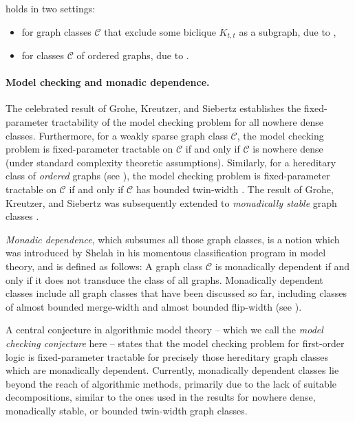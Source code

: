 \documentclass[11pt]{article}
\newcommand{\sz}[1]{\todo[color=pink!40]{sz: #1}}
\theoremstyle{remark}
\def\cal{\mathcal}
\newcommand{\CC}{\cal C}
\begin{document}
  holds in two settings:
 \begin{itemize}
  \item for graph classes $\CC$ that exclude some biclique $K_{t,t}$ as a subgraph, due to ,
  \item for classes $\CC$ of ordered graphs, due to .
 \end{itemize}


\paragraph{Model checking and monadic dependence.}
The celebrated result of Grohe, Kreutzer, and Siebertz \cite{gks} establishes the fixed-parameter tractability
of the model checking problem
for all nowhere dense classes.
Furthermore, for a weakly sparse graph class $\CC$,
the model checking problem is fixed-parameter tractable on $\CC$ if and only if $\CC$
is nowhere dense (under standard complexity theoretic assumptions).
Similarly, for a hereditary class of \emph{ordered} graphs (see ),
the model  checking problem is fixed-parameter tractable on $\CC$ if and only if $\CC$ has bounded twin-width \cite{tww4}.
The result of Grohe, Kreutzer, and Siebertz  was subsequently extended to \emph{monadically stable} graph classes \cite{ms-mc1,ms-mc2}.

\emph{Monadic dependence}, which subsumes all those graph classes,
 is a notion which was introduced by Shelah in his momentous classification program in model theory, and is defined as follows:
A graph class $\CC$ is monadically dependent if and only if it does not transduce the class of all graphs.
Monadically dependent classes include all graph classes that
have been discussed so far, including classes of almost bounded merge-width and almost bounded flip-width (see ).

\medskip
A central conjecture in algorithmic model theory -- which we call the \emph{model checking conjecture} here -- states that the model checking problem for first-order logic is fixed-parameter tractable for precisely those hereditary graph classes which are
monadically dependent.
Currently,
monadically dependent classes lie beyond the reach of algorithmic methods,
primarily due to the lack of suitable decompositions, similar to the ones
used in the results for nowhere dense, monadically stable, or bounded twin-width graph classes.
\end{document}
